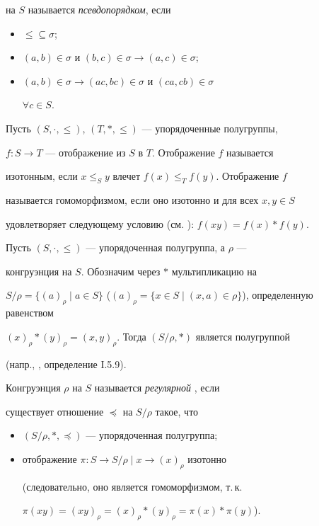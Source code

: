 на $S$ называется {\it псевдопорядком}, если 


\begin{itemize} 


\item[1)] $\le\subseteq\sigma$; 


\item[2)] $(a,b)\in \sigma$ и $(b,c)\in\sigma\to(a,c)\in\sigma$; 


\item[3)] $(a,b)\in\sigma\to(ac,bc)\in\sigma$ и $(ca,cb)\in\sigma$ 


$\forall c\in S$. 


\end{itemize} 


 


Пусть $(S,\cdot,\le)$, $(T,*,\le)$ --- упорядоченные полугруппы, 


$f:S\to T$ --- отображение из $S$ в $T$. Отображение $f$ называется 


изотонным, если $x\le_S y$ влечет $f(x)\le_T f(y)$. Отображение $f$ 


называется гомоморфизмом, если оно изотонно и для всех $x,y\in S$ 


удовлетворяет следующему условию (см. \cite{4}): $f(xy)=f(x)*f(y)$. 


 


Пусть $(S,\cdot,\le)$ --- упорядоченная полугруппа, а $\rho$ --- 


конгруэнция на $S$. Обозначим через $*$ мультипликацию на 


$S/\rho=\{(a)_\rho\mid a\in S\}$ ($(a)_\rho=\{x\in 


S\mid(x,a)\in\rho\}$), определенную равенством 


$(x)_\rho*(y)_\rho=(x,y)_\rho$. Тогда $(S/\rho,*)$ является полугруппой 


(напр., \cite{5}, определение I.5.9). 


 


Конгруэнция $\rho$ на $S$ называется {\it регулярной} \cite{3}, если 


существует отношение $\preceq$ на $S/\rho$ такое, что 


\begin{itemize} 


\item[1)] $(S/\rho,*,\preceq)$ --- упорядоченная полугруппа; 


\item[2)] отображение $\pi:S\to S/\rho\mid x\to (x)_\rho$ изотонно 


(следовательно, оно является гомоморфизмом, т.\,к. 


$\pi(xy)=(xy)_\rho=(x)_\rho*(y)_\rho=\pi(x)*\pi(y)$). 


\end{itemize} 


